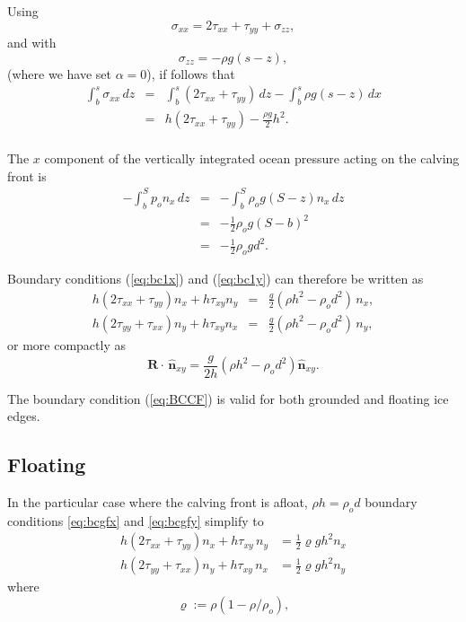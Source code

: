 \documentclass[10pt,a4paper]{book}
\newcommand{\txx}{\tau_{xx}}
\newcommand{\tyy}{\tau_{yy}}
\newcommand{\txy}{\tau_{xy}}
\newcommand{\sxx}{\sigma_{xx}}
\newcommand{\szz}{\sigma_{zz}}
\newcommand{\normal}{\hat{\bm{n}}}
\begin{document}
Using
\[ \sxx=2 \txx +\tyy + \szz ,\]
and with
\[ \szz=-\rho g (s-z) ,\]
(where we have set $\alpha=0$), if follows that
\begin{eqnarray*}
\int_b^s \sxx \, dz &=& \int_b^s (2 \txx + \tyy) \, dz - \int_b^s \rho g (s-z) \, dx \nonumber \\
                    &=& h (2 \txx + \tyy)  - \frac{\rho g}{2} h^2 . \nonumber \\
\end{eqnarray*}

The $x$ component of the vertically integrated ocean pressure acting on the calving front is
\begin{eqnarray*}
-\int_b^S  p_o n_x \, dz &=& -\int_b^S  \rho_o g (S-z) n_x \, dz \\
&=& -\frac{1}{2} \rho_o g (S-b)^2 \\
&=& -\frac{1}{2} \rho_o g d^2 .
\end{eqnarray*}

Boundary conditions (\ref{eq:bc1x}) and (\ref{eq:bc1y}) can therefore be written as
\begin{eqnarray}
h (2 \txx + \tyy) n_x + h \txy n_y &=&  \frac{g}{2} (\rho h^2 - \rho_o  d^2)\, n_x ,\label{eq:bcgfx} \\
h (2 \tyy + \txx) n_y + h \txy n_x &=&  \frac{g}{2} (\rho h^2 - \rho_o  d^2)\, n_y ,\label{eq:bcgfy}
\end{eqnarray}
or more compactly as
\begin{equation}
\bm{R} \cdot \, \normal_{xy}=\frac{g}{2h} ( \rho h^2-\rho_o d^2) \normal_{xy} .
\label{eq:BCCF}
\end{equation}

The boundary condition (\ref{eq:BCCF}) is valid for both grounded and floating ice edges.



\subsection{Floating} 
In the particular case where the calving front is afloat, $\rho h
=\rho_o d$ boundary conditions \eqref{eq:bcgfx} and
\eqref{eq:bcgfy} simplify to
\begin{align}
h (2 \txx + \tyy) n_x + h \txy \,n_y &= \frac{1}{2} \varrho g h^2   n_x \label{eq:bgfxfloat} \\
h (2 \tyy + \txx) n_y + h \txy \,n_x &= \frac{1}{2} \varrho g h^2   n_y \label{eq:bgfyfloat} 
\end{align}
where
\[
\varrho:=\rho (1-\rho/\rho_o) ,
\]
\end{document}
